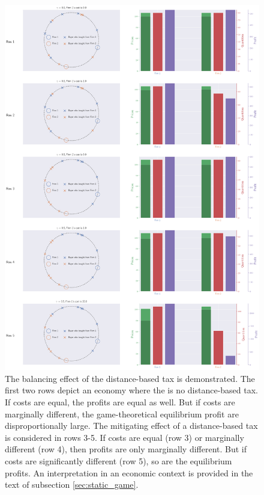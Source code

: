 \documentclass[final,3p,times,authoryear,12pt]{elsarticle}
\begin{document}
\begin{figure}[[p!htb] %
  \centering
  \vspace{-2cm} %
  \includegraphics[width=\linewidth]{static_game.png}
  \caption{\small{
  		The balancing effect of the distance-based tax is demonstrated. 
		The first two rows depict an economy where the is no distance-based tax. 
		If costs are equal, the profits are equal as well. 
		But if costs are marginally different, the game-theoretical equilibrium profit are disproportionally large. 
		The mitigating effect of a distance-based tax is considered in rows 3-5. 
		If costs are equal (row 3) or marginally different (row 4), then profits are only marginally different. 
		But if costs are significantly different (row 5), so are the equilibrium profits. 
		An interpretation in an economic context is provided in the text of subsection \ref{sec:static_game}. 
		 }}
  \label{fig:static_game}
\end{figure}
\end{document}
